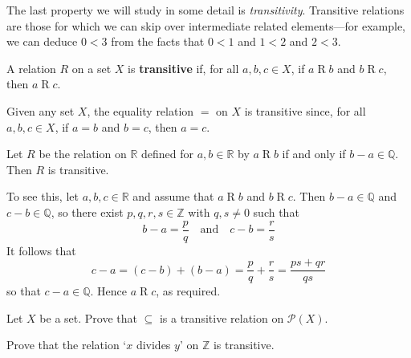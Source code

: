 The last property we will study in some detail is \textit{transitivity}. Transitive relations are those for which we can skip over intermediate related elements---for example, we can deduce $0 < 3$ from the facts that $0 < 1$ and $1 < 2$ and $2 < 3$.

\begin{definition}
\label{defTransitiveRelation}
A relation $R$ on a set $X$ is \textbf{transitive} if, for all $a,b,c \in X$, if $a \mathrel{R} b$ and $b \mathrel{R} c$, then $a \mathrel{R} c$.
\end{definition}

\begin{center}
\end{center}

\begin{example}
\label{exEqualityIsTransitive}
Given any set $X$, the equality relation $=$ on $X$ is transitive since, for all $a,b,c \in X$, if $a=b$ and $b=c$, then $a=c$.
\end{example}

\begin{example}
\label{exDifferenceOfRealsInQIsTransitive}
Let $R$ be the relation on $\mathbb{R}$ defined for $a,b \in \mathbb{R}$ by $a \mathrel{R} b$ if and only if $b-a \in \mathbb{Q}$. Then $R$ is transitive.

To see this, let $a,b,c \in \mathbb{R}$ and assume that $a \mathrel{R} b$ and $b \mathrel{R} c$. Then $b-a \in \mathbb{Q}$ and $c-b \in \mathbb{Q}$, so there exist $p,q,r,s \in \mathbb{Z}$ with $q,s \ne 0$ such that
\[ b-a = \dfrac{p}{q} \quad \text{and} \quad c-b = \dfrac{r}{s} \]
It follows that 
\[ c-a = (c-b) + (b-a) = \dfrac{p}{q} + \dfrac{r}{s} = \dfrac{ps+qr}{qs} \]
so that $c-a \in \mathbb{Q}$. Hence $a \mathrel{R} c$, as required.
\end{example}

\begin{exercise}
Let $X$ be a set. Prove that $\subseteq$ is a transitive relation on $\mathcal{P}(X)$.
\end{exercise}

\begin{exercise}
\label{exDivisibilityIsTransitive}
Prove that the relation `$x$ divides $y$' on $\mathbb{Z}$ is transitive.
\end{exercise}

